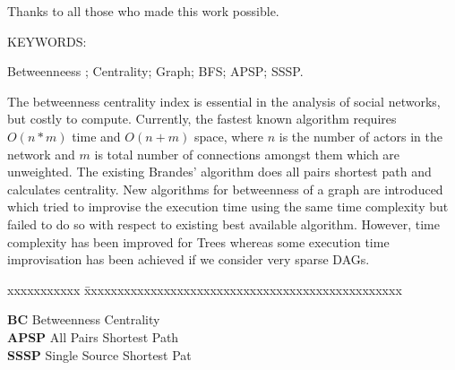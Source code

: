 \documentclass[MTech]{iitmdiss}
\begin{document}
Thanks to all those who made this work possible.


\abstract

\noindent KEYWORDS: \hspace*{0.5em} \parbox[t]{4.4in}{Betweenneess ; Centrality;
  Graph; BFS; APSP; SSSP.}

\vspace*{24pt}

\noindent 

The betweenness centrality index is essential in the analysis of social networks, but costly to compute. Currently, the fastest known algorithm requires $O(n*m)$ time and $O(n+m)$ space, where $n$ is the number of actors in the network and $m$ is total number of connections amongst them which are unweighted. The existing  Brandes' algorithm does all pairs shortest path and calculates centrality. New algorithms for betweenness of a graph are introduced which tried to improvise the execution time using the same time complexity but failed to do so with respect to existing best available algorithm. However, time complexity has been improved for Trees whereas some execution time improvisation has been achieved if we consider very sparse DAGs.

\pagebreak




\begin{singlespace}
\tableofcontents
\thispagestyle{empty}

\listoffigures
{}
\end{singlespace}


\abbreviations

\noindent 
\begin{tabbing}
xxxxxxxxxxx \= xxxxxxxxxxxxxxxxxxxxxxxxxxxxxxxxxxxxxxxxxxxxxxxx \kill

\textbf{BC} \> Betweenness Centrality \\
\textbf{APSP} \> All Pairs Shortest Path \\
\textbf{SSSP} \> Single Source Shortest Pat \\
\end{tabbing}
\end{document}
